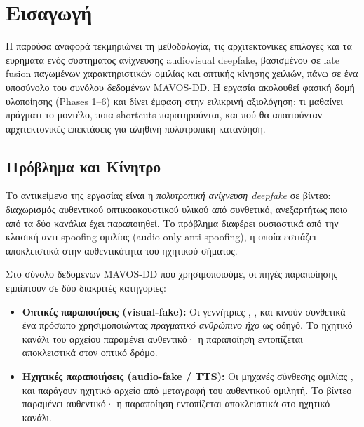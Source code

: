 \chapter{Εισαγωγή}

Η παρούσα αναφορά τεκμηριώνει τη μεθοδολογία, τις αρχιτεκτονικές επιλογές
και τα ευρήματα ενός συστήματος ανίχνευσης audiovisual deepfake, βασισμένου
σε late fusion παγωμένων χαρακτηριστικών ομιλίας και οπτικής κίνησης χειλιών,
πάνω σε ένα υποσύνολο του συνόλου δεδομένων MAVOS-DD.
Η εργασία ακολουθεί φασική δομή υλοποίησης (Phases 1–6)
και δίνει έμφαση στην ειλικρινή αξιολόγηση: τι μαθαίνει πράγματι
το μοντέλο, ποια shortcuts παρατηρούνται, και πού θα απαιτούνταν
αρχιτεκτονικές επεκτάσεις για αληθινή πολυτροπική κατανόηση.

\section{Πρόβλημα και Κίνητρο}

Το αντικείμενο της εργασίας είναι η \emph{πολυτροπική ανίχνευση deepfake} σε
βίντεο: διαχωρισμός αυθεντικού οπτικοακουστικού υλικού από συνθετικό,
ανεξαρτήτως ποιο από τα δύο κανάλια έχει παραποιηθεί. Το πρόβλημα
διαφέρει ουσιαστικά από την κλασική αντι-spoofing ομιλίας
(audio-only anti-spoofing), η οποία εστιάζει αποκλειστικά
στην αυθεντικότητα του ηχητικού σήματος.

Στο σύνολο δεδομένων MAVOS-DD που χρησιμοποιούμε, οι πηγές
παραποίησης εμπίπτουν σε δύο διακριτές κατηγορίες:

\begin{itemize}
  \item \textbf{Οπτικές παραποιήσεις (visual-fake):} Οι γεννήτριες
    , ,  και
     κινούν συνθετικά ένα πρόσωπο χρησιμοποιώντας
    \emph{πραγματικό ανθρώπινο ήχο} ως οδηγό.
    Το ηχητικό κανάλι του αρχείου  παραμένει αυθεντικό·
    η παραποίηση εντοπίζεται αποκλειστικά στον οπτικό δρόμο.
  \item \textbf{Ηχητικές παραποιήσεις (audio-fake / TTS):} Οι μηχανές
    σύνθεσης ομιλίας , 
    και  παράγουν ηχητικό αρχείο από μεταγραφή
    του αυθεντικού ομιλητή. Το βίντεο παραμένει αυθεντικό· η παραποίηση
    εντοπίζεται αποκλειστικά στο ηχητικό κανάλι.
\end{itemize}

